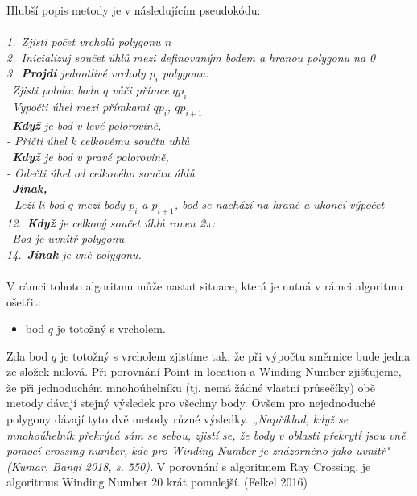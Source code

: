 \documentclass{article}
\begin{document}
Hlubší popis metody je v následujícím pseudokódu:\\
\vspace{0.2cm}\\
\indent\textit{{1.~}Zjisti počet vrcholů polygonu $n$}\\
\indent\textit{{2.~}Inicializuj součet úhlů mezi definovaným bodem a hranou polygonu na 0}\\
\indent\textit{{3.~}\textbf{Projdi} jednotlivé vrcholy $p_{i}$ polygonu:}\\
\indent\indent\textit{\textbullet\ Zjisti polohu bodu $q$ vůči přímce $qp_{i}$}\\
\indent\indent\textit{\textbullet\ Vypočti úhel mezi přímkami $qp_{i}$, $qp_{i+1}$}\\
\indent\indent\textit{\textbullet\ \textbf{Když} je bod v levé polorovině,}\\
\indent\indent\indent\textit{\textrm{- }Přičti úhel k celkovému součtu uhlů}\\
\indent\indent\textit{\textbullet\ \textbf{Když} je bod v pravé polorovině,}\\
\indent\indent\indent\textit{\textrm{- }Odečti úhel od celkového součtu úhlů}\\
\indent\indent\textit{\textbullet\ \textbf{Jinak,}}\\
\indent\indent\indent\textit{\textrm{- }Leží-li bod $q$ mezi body $p_{i}$ a $p_{i+1}$, bod se nachází na hraně a ukončí výpočet}\\
\indent\textit{{12.~}\textbf{Když} je celkový součet úhlů roven 2$\pi$:}\\
\indent\indent\textit{\textbullet\ Bod je uvnitř polygonu}\\
\indent\textit{{14.~}\textbf{Jinak} je vně polygonu.}\\
\vspace{0.2cm}\\
V rámci tohoto algoritmu může nastat situace, která je nutná v rámci algoritmu ošetřit:\begin{itemize}
    \item bod $q$ je totožný s vrcholem.
\end{itemize}
Zda bod $q$ je totožný s vrcholem zjistíme tak, že při výpočtu směrnice bude jedna ze složek nulová.
Při porovnání Point-in-location a Winding Number zjišťujeme, že při jednoduchém mnohoúhelníku (tj. nemá žádné vlastní průsečíky) obě metody dávají stejný výsledek pro všechny body. Ovšem pro nejednoduché polygony dávají tyto dvě metody různé výsledky. \textit{„Například, když se mnohoúhelník překrývá sám se sebou, zjistí se, že body v oblasti překrytí jsou vně pomocí crossing number, kde pro Winding Number je znázorněno jako uvnitř" (Kumar, Bangi 2018, s. 550).} V porovnání s algoritmem Ray Crossing, je algoritmus Winding Number 20 krát pomalejší. (Felkel 2016)
\end{document}

